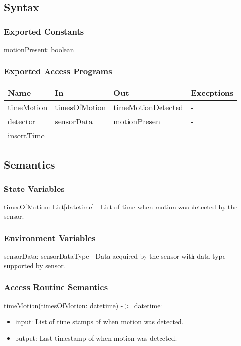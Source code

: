 \documentclass[12pt, titlepage]{article}
\begin{document}
\subsection{Syntax}

\subsubsection{Exported Constants}
motionPresent: boolean

\subsubsection{Exported Access Programs}

\begin{center}
\begin{tabular}{p{2cm} p{4cm} p{4cm} p{2cm}}
\hline
\textbf{Name} & \textbf{In} & \textbf{Out} & \textbf{Exceptions} \\
\hline
timeMotion & timesOfMotion & timeMotionDetected & - \\
detector & sensorData & motionPresent & - \\
insertTime & - & - & - \\
\hline
\end{tabular}
\end{center}

\subsection{Semantics}

\subsubsection{State Variables}

timesOfMotion: List[datetime] - List of time when motion was detected by the sensor.

\subsubsection{Environment Variables}
sensorData: sensorDataType - Data acquired by the sensor with data type supported by sensor.

\subsubsection{Access Routine Semantics}

\noindent timeMotion(timesOfMotion: datetime) -$>$ datetime:
\begin{itemize}
\item input: List of time stamps of when motion was detected. 
\item output: Last timestamp of when motion was detected. 
\end{itemize}
\end{document}
